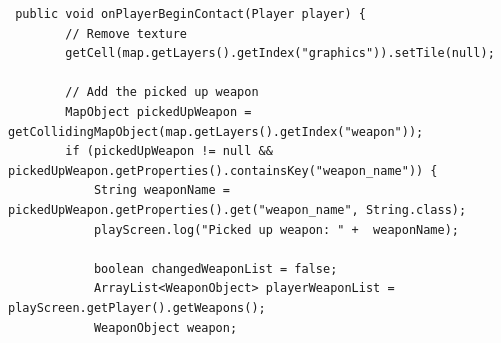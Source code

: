 \documentclass[12p]{article}
\begin{document}
\begin{verbatim}
 public void onPlayerBeginContact(Player player) {
        // Remove texture
        getCell(map.getLayers().getIndex("graphics")).setTile(null);

        // Add the picked up weapon
        MapObject pickedUpWeapon = getCollidingMapObject(map.getLayers().getIndex("weapon"));
        if (pickedUpWeapon != null && pickedUpWeapon.getProperties().containsKey("weapon_name")) {
            String weaponName = pickedUpWeapon.getProperties().get("weapon_name", String.class);
            playScreen.log("Picked up weapon: " +  weaponName);

            boolean changedWeaponList = false;
            ArrayList<WeaponObject> playerWeaponList = playScreen.getPlayer().getWeapons();
            WeaponObject weapon;
            

\end{verbatim}
\end{document}

